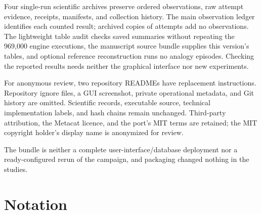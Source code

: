 \documentclass[10pt,letterpaper]{article}
\begin{document}
Four single-run scientific archives preserve ordered observations, raw attempt evidence,
receipts, manifests, and collection history. The main observation ledger identifies each
counted result; archived copies of attempts add no observations. The lightweight table
audit checks saved summaries without repeating the 969,000 engine executions, the
manuscript source bundle supplies this version's tables, and optional reference
reconstruction runs no analogy episodes. Checking the reported results needs neither the
graphical interface nor new experiments.

For anonymous review, two repository READMEs have replacement instructions. Repository
ignore files, a GUI screenshot, private operational metadata, and Git history are omitted.
Scientific records, executable source, technical implementation labels, and hash chains
remain unchanged. Third-party attribution, the Metacat licence, and the port's MIT terms
are retained; the MIT copyright holder's display name is anonymized for review.

The bundle is neither a complete user-interface/database deployment nor a ready-configured
rerun of the campaign, and packaging changed nothing in the studies.

\clearpage

\section{Notation}\label{app:notation}
\end{document}
